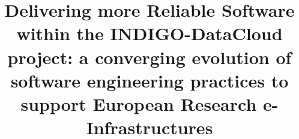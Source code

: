%
%
%
%
%
%
\RequirePackage{fix-cm}
%
\documentclass[smallextended]{svjour3}       %
%
\smartqed  %
%
\usepackage{graphicx}
\usepackage{array}
\usepackage{subfigure}
\usepackage{adjustbox}
\usepackage{listings}
\usepackage{url}
\usepackage{cite}




%
%
%
%
%


\title{Delivering more Reliable Software within the INDIGO-DataCloud project: a converging evolution of software engineering practices to support European Research e-Infrastructures}

